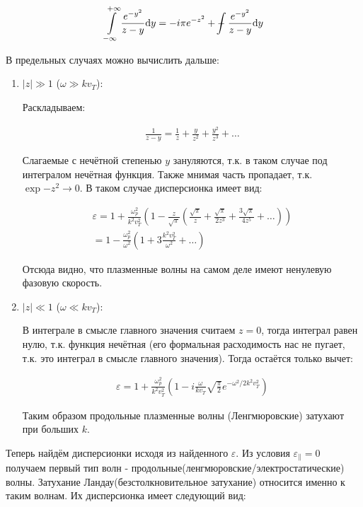 \documentclass[10pt, a4paper]{article}
\def\Xint#1{\mathchoice
 {\XXint\displaystyle\textstyle{#1}}%
 {\XXint\textstyle\scriptstyle{#1}}%
 {\XXint\scriptstyle\scriptscriptstyle{#1}}%
 {\XXint\scriptscriptstyle\scriptscriptstyle{#1}}%
 \!\int}
\def\XXint#1#2#3{{\setbox0=\hbox{$#1{#2#3}{\int}$}
   \vcenter{\hbox{$#2#3$}}\kern-.5\wd0}}
\def\dashint{\Xint-}
\begin{document}
\begin{equation*}
	\int\limits_{-\infty}^{+\infty}\frac{e^{-y^2}}{z-y}\dd y = -i\pi e^{-z^2} + \dashint\frac{e^{-y^2}}{z-y}\dd y
\end{equation*}

В предельных случаях можно вычислить дальше:

\begin{enumerate}
	\item $|z| \gg 1$ ($\omega \gg kv_T$):
	
	Раскладываем:
	
	\begin{align*}
		\frac{1}{z-y} = \frac{1}{z} + \frac{y}{z^2} + \frac{y^2}{z^3} + \dots
	\end{align*}

	Слагаемые с нечётной степенью $y$ зануляются, т.к. в таком случае под интегралом нечётная функция. Также мнимая часть пропадает, т.к. $\exp{-z^2}\rightarrow 0$. В таком случае дисперсионка имеет вид:
	
	\begin{align*}
		\varepsilon = 1 + \frac{\omega_p^2}{k^2 v_T^2} \left( 1 - \frac{z}{\sqrt{\pi}}\left( \frac{\sqrt{\pi}}{z} + \frac{\sqrt{\pi}}{2z^3} + \frac{3\sqrt{\pi}}{4z^5} + \dots \right) \right) \\
		=1 - \frac{\omega_p^2}{\omega^2}\left( 1 + 3\frac{k^2 v_T^2}{\omega^2} + \dots \right)
	\end{align*}

	Отсюда видно, что плазменные волны на самом деле имеют ненулевую фазовую скорость.
	
	\item $|z| \ll 1$ ($\omega \ll kv_T$):
	
	В интеграле в смысле главного значения считаем $z=0$, тогда интеграл равен нулю, т.к. функция нечётная (его формальная расходимость нас не пугает, т.к. это интеграл в смысле главного значения). Тогда остаётся только вычет:
	
	\begin{align*}
		\varepsilon = 1 + \frac{\omega_p^2}{k^2 v_T^2} \left( 1 - i \frac{\omega}{k v_T}\sqrt{\frac{\pi}{2}}e^{-\omega^2/2k^2v_T^2} \right)
	\end{align*}

	Таким образом продольные плазменные волны (Ленгмюровские) затухают при больших $k$.
	
\end{enumerate}

Теперь найдём дисперсионки исходя из найденного $\varepsilon$. Из условия $\varepsilon_{\parallel} = 0$ получаем первый тип волн - продольные(ленгмюровские/электростатические) 
волны. Затухание Ландау(безстолкновительное затухание) относится именно к таким волнам. Их дисперсионка имеет следующий
вид:
\end{document}

